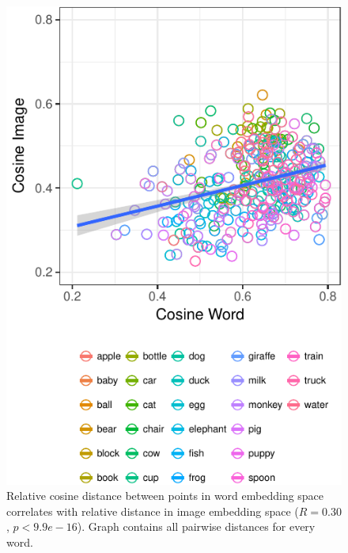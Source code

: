 \documentclass[10pt, letterpaper]{article}
\newenvironment{CodeChunk}{}{}
\begin{document}
\begin{CodeChunk}
\begin{figure}[tb]
\includegraphics{figs/pairwise-corr-1} \caption[Relative cosine distance between points in word embedding space correlates with relative distance in image embedding space ($R = 0.30$, $p < 9.9e-16$)]{Relative cosine distance between points in word embedding space correlates with relative distance in image embedding space ($R = 0.30$, $p < 9.9e-16$). Graph contains all pairwise distances for every word.}\label{fig:pairwise-corr}
\end{figure}
\end{CodeChunk}
\end{document}
